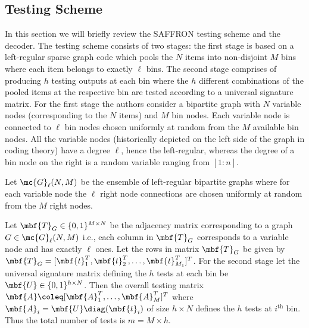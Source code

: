\documentclass[conference,twocolumn]{IEEEtran}
\begin{document}
{\subsection*{Testing Scheme}
In this section we will briefly review the SAFFRON testing scheme \cite{lee2015saffron} and the decoder. The testing scheme consists of two stages: the first stage is based on a left-regular sparse graph code which pools the $N$ items into non-disjoint $M$ bins where each item belongs to exactly $\ell$ bins. The second stage comprises of producing $h$ testing outputs at each bin where the $h$ different combinations of the pooled items at the respective bin are tested according to a universal signature matrix. For the first stage the authors consider a bipartite graph with $N$ variable nodes (corresponding to the $N$ items) and $M$ bin nodes. Each variable node is connected to $\ell$ bin nodes chosen uniformly at random from the $M$ available bin nodes. All the variable nodes (historically depicted on the left side of the graph in coding theory) have a degree $\ell$, hence the left-regular, whereas the degree of a bin node on the right is a random variable ranging from $[1:n]$.

\begin{definition}
Let $\mc{G}_{\ell}(N,M)$ be the ensemble of left-regular bipartite graphs where for each variable node the $\ell$ right node connections are chosen uniformly at random from the $M$ right nodes.
\end{definition}

 Let $\mbf{T}_{G}\in\{0,1\}^{M\times N }$ be the adjacency matrix corresponding to a graph $G\in\mc{G}_{\ell}(N,M)$ i.e., each column in $\mbf{T}_{G}$ corresponds to a variable node and has exactly $\ell$ ones. Let the rows in matrix $\mbf{T}_{G}$ be given by $\mbf{T}_{G}=[\mbf{t}^{T}_1,\mbf{t}^{T}_{2},\dots, \mbf{t}^{T}_{M_1}]^{T}$. For the second stage let the universal signature matrix defining the $h$ tests at each bin be $\mbf{U}\in\{0,1\}^{h\times N}$. Then the overall testing matrix $\mbf{A}\coleq [\mbf{A}_{1}^{T},\ldots,\mbf{A}_{M}^{T}]^T$ where $\mbf{A}_{i}=\mbf{U} \diag (\mbf{t}_i)$ of size $h\times N$ defines the $h$ tests at $i^{\text{th}}$ bin. Thus the total number of tests is $m=M\times h$.


}
\end{document}
